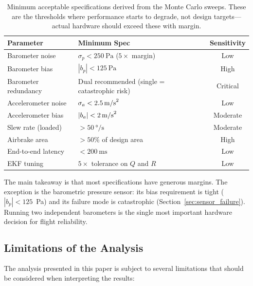 \documentclass[11pt,letterpaper]{article}
\newcommand{\mpers}{\si{\metre\per\second}}
\begin{document}
\begin{table}[H]
    \centering
    \caption{Minimum acceptable specifications derived from the Monte Carlo sweeps. These are the thresholds where performance starts to degrade, not design targets---actual hardware should exceed these with margin.}
    \label{tab:min_specs}
    \begin{tabular}{p{4cm}p{4.5cm}c}
        \toprule
        \textbf{Parameter} & \textbf{Minimum Spec} & \textbf{Sensitivity} \\
        \midrule
        Barometer noise & $\sigma_p < \SI{250}{\pascal}$ ($5\times$ margin) & Low \\
        Barometer bias & $|b_p| < \SI{125}{\pascal}$ & High \\
        Barometer redundancy & Dual recommended (single = catastrophic risk) & Critical \\
        Accelerometer noise & $\sigma_a < \SI{2.5}{\mpers\squared}$ & Low \\
        Accelerometer bias & $|b_a| < \SI{2}{\mpers\squared}$ & Moderate \\
        Slew rate (loaded) & $> \SI{50}{\degree/\second}$ & Moderate \\
        Airbrake area & $> 50\%$ of design area & High \\
        End-to-end latency & $< \SI{200}{\milli\second}$ & Low \\
        EKF tuning & $5\times$ tolerance on $Q$ and $R$ & Low \\
        \bottomrule
    \end{tabular}
\end{table}

The main takeaway is that most specifications have generous margins. The exception is the barometric pressure sensor: its bias requirement is tight ($|b_p| < 125$~Pa) and its failure mode is catastrophic (Section~\ref{sec:sensor_failure}). Running two independent barometers is the single most important hardware decision for flight reliability.

\subsection{Limitations of the Analysis}
\label{sec:limitations}

The analysis presented in this paper is subject to several limitations that should be considered when interpreting the results:
\end{document}
